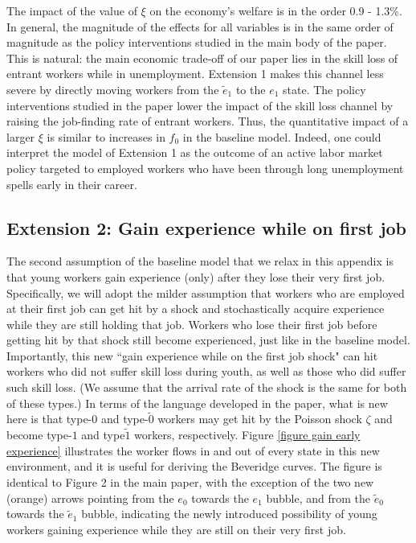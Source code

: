 \documentclass[12pt]{article} %
\theoremstyle{definition}
\begin{document}
The impact of the value of $\xi$ on the economy's welfare is in the order 0.9 - 1.3\%.
In general, the magnitude of the effects for all variables is in the same order of magnitude as the policy interventions studied in the main body of the paper.
This is natural: the main economic trade-off of our paper lies in the skill loss of entrant workers while in unemployment.
Extension 1 makes this channel less severe by directly moving workers from the $\tilde{e}_{1}$ to the $e_{1}$ state.
The policy interventions studied in the paper lower the impact of the skill loss channel by raising the job-finding rate of entrant workers.
Thus, the quantitative impact of a larger $\xi$ is similar to increases in $f_{0}$ in the baseline model.
Indeed, one could interpret the model of Extension 1 as the outcome of an active labor market policy \citep{heckman1999economics} targeted to employed workers who have been through long unemployment spells early in their career.


\subsection{Extension 2: Gain experience while on first job}\label{section extension gain earlier experience}

The second assumption of the baseline model that we relax in this appendix is that young workers gain experience (only) after they lose their very first job. Specifically, we will adopt the milder assumption that workers who are employed at their first job can get hit by a shock and stochastically acquire experience while they are still holding that job. Workers who lose their first job before getting hit by that shock still become experienced, just like in the baseline model. Importantly, this new ``gain experience while on the first job shock" can hit workers who did not suffer skill loss during youth, as well as those who did suffer such skill loss. (We assume that the arrival rate of the shock is the same for both of these types.) In terms of the language developed in the paper, what is new here is that type-0 and type-$\tilde{0}$ workers may get hit by the Poisson shock $\zeta$ and become type-$1$ and type$\tilde{1}$ workers, respectively. Figure \ref{figure gain early experience} illustrates the worker flows in and out of every state in this new environment, and it is useful for deriving the Beveridge curves. The figure is identical to Figure 2 in the main paper, with the exception of the two new (orange) arrows pointing from the $e_0$ towards the $e_1$ bubble, and from the $\tilde{e}_0$ towards the $\tilde{e}_1$ bubble, indicating the newly introduced possibility of young workers gaining experience while they are still on their very first job. 
\end{document}
